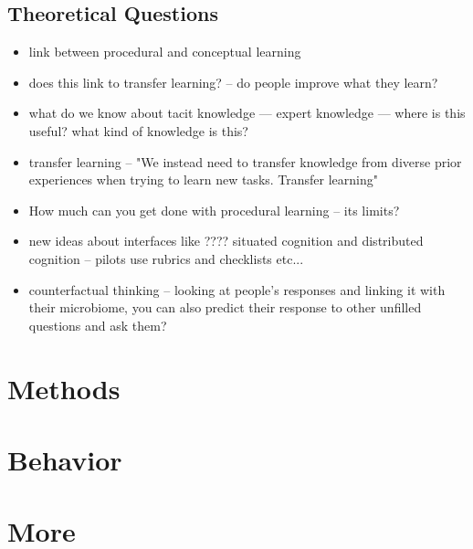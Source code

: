 \subsection{Theoretical Questions}
\begin{itemize}
\item link between procedural and conceptual learning
\item does this link to transfer learning? -- do people improve what they learn?
\item what do we know about tacit knowledge — expert knowledge  --- where is this useful? what kind of knowledge is this?
\item transfer learning --  "We instead need to transfer knowledge from diverse prior experiences when trying to learn new tasks. Transfer learning"
\item How much can you get done with procedural learning -- its limits?
\item new ideas about interfaces like ????
situated cognition and distributed cognition -- pilots use rubrics and checklists etc...
\item counterfactual thinking -- looking at people’s responses and linking it with their microbiome, you can also predict their response to other unfilled questions and ask them?
\end{itemize}

\section{Methods} 




\section{Behavior} 


\section{More} 

